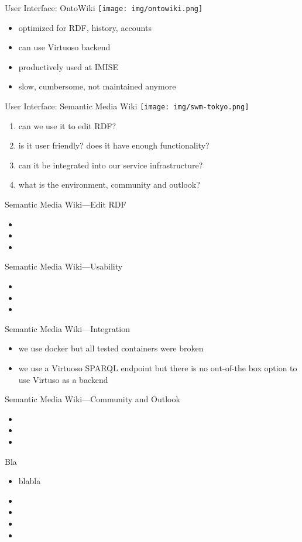 \documentclass[aspectratio=1610]{beamer}
\begin{document}
\begin{frame}{User Interface: OntoWiki}
\centering
\texttt{[image: img/ontowiki.png]}
\begin{itemize}
\item optimized for RDF, history, accounts
\item can use Virtuoso backend
\item productively used at IMISE
\item slow, cumbersome, not maintained anymore
\end{itemize}
\end{frame}

\begin{frame}{User Interface: Semantic Media Wiki}
\centering
\texttt{[image: img/swm-tokyo.png]}
\begin{enumerate}
\item can we use it to edit RDF?
\item is it user friendly? does it have enough functionality?
\item can it be integrated into our service infrastructure?
\item what is the environment, community and outlook?
\end{enumerate}
\end{frame}

\begin{frame}{Semantic Media Wiki---Edit RDF}
\begin{itemize}
\item 
\item 
\item 
\end{itemize}
\end{frame}

\begin{frame}{Semantic Media Wiki---Usability}
\begin{itemize}
\item 
\item 
\item 
\end{itemize}
\end{frame}

\begin{frame}{Semantic Media Wiki---Integration}
\begin{itemize}
\item we use docker but all tested containers were broken
\item we use a Virtuoso SPARQL endpoint but there is no out-of-the box option to use Virtuso as a backend
\end{itemize}
\end{frame}

\begin{frame}{Semantic Media Wiki---Community and Outlook}
\begin{itemize}
\item  
\item 
\item 
\end{itemize}
\end{frame}

\begin{frame}{Bla}
\begin{itemize}
\item blabla
\item 
\item 
\item 
\item 
\end{itemize}
\end{frame}
\end{document}
